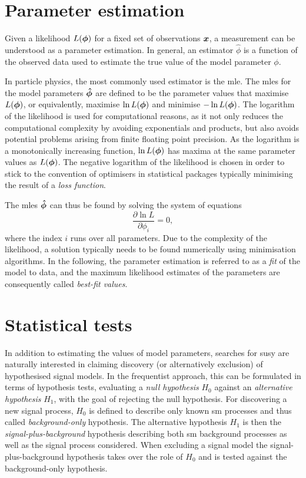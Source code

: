 \section{Parameter estimation}

Given a likelihood $L(\makemebold{\phi})$ for a fixed set of observations $\makemebold{x}$, a measurement can be understood as a parameter estimation. In general, an estimator $\hat{\phi}$ is a function of the observed data used to estimate the true value of the model parameter $\phi$.

In particle physics, the most commonly used estimator is the \gls{mle}. The \glspl{mle} for the model parameters $\makemebold{\hat{\phi}}$ are defined to be the parameter values that maximise $L(\makemebold{\phi})$, or equivalently, maximise $\ln{L(\makemebold{\phi})}$ and minimise $-\ln{L(\makemebold{\phi})}$. The logarithm of the likelihood is used for computational reasons, as it not only reduces the computational complexity by avoiding exponentials and products, but also avoids potential problems arising from finite floating point precision. As the logarithm is a monotonically increasing function, $\ln{L(\makemebold{\phi})}$ has maxima at the same parameter values as ${L(\makemebold{\phi})}$. The negative logarithm of the likelihood is chosen in order to stick to the convention of optimisers in statistical packages typically minimising the result of a \textit{loss function}.

The \glspl{mle} $\makemebold{\hat{\phi}}$ can thus be found by solving the system of equations
\begin{equation}
 \frac{\partial \ln L}{\partial\phi_i} = 0,
\end{equation}
where the index $i$ runs over all parameters. Due to the complexity of the likelihood, a solution typically needs to be found numerically using minimisation algorithms. In the following, the parameter estimation is referred to as a \textit{fit} of the model to data, and the maximum likelihood estimates of the parameters are consequently called \textit{best-fit values}.

\section{Statistical tests}

In addition to estimating the values of model parameters, searches for \gls{susy} are naturally interested in claiming discovery (or alternatively exclusion) of hypothesised signal models. In the frequentist approach, this can be formulated in terms of hypothesis tests, evaluating a \textit{null hypothesis} $H_0$ against an \textit{alternative hypothesis} $H_1$, with the goal of rejecting the null hypothesis. For discovering a new signal process, $H_0$ is defined to describe only known \gls{sm} processes and thus called \textit{background-only} hypothesis. The alternative hypothesis $H_1$ is then the \textit{signal-plus-background} hypothesis describing both \gls{sm} background processes as well as the signal process considered. When excluding a signal model the signal-plus-background hypothesis takes over the role of $H_0$ and is tested against the background-only hypothesis.

